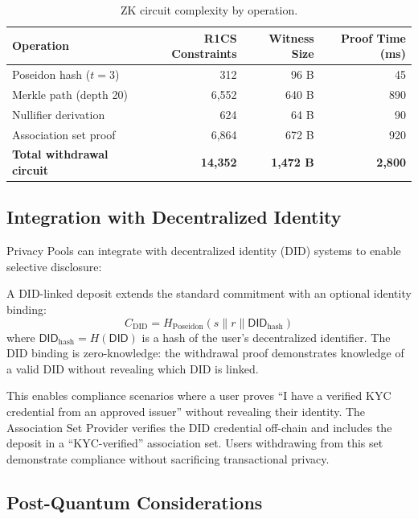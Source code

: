 \begin{table}[H]
\centering
\caption{ZK circuit complexity by operation.}
\label{tab:circuitcomplexity}
\begin{tabular}{lrrr}
\toprule
\textbf{Operation} & \textbf{R1CS Constraints} & \textbf{Witness Size} & \textbf{Proof Time (ms)} \\
\midrule
Poseidon hash ($t=3$) & 312 & 96 B & 45 \\
Merkle path (depth 20) & 6,552 & 640 B & 890 \\
Nullifier derivation & 624 & 64 B & 90 \\
Association set proof & 6,864 & 672 B & 920 \\
\midrule
\textbf{Total withdrawal circuit} & \textbf{14,352} & \textbf{1,472 B} & \textbf{2,800} \\
\bottomrule
\end{tabular}
\end{table}

\subsection{Integration with Decentralized Identity}

Privacy Pools can integrate with decentralized identity (DID) systems to enable selective disclosure:

\begin{definition}
A DID-linked deposit extends the standard commitment with an optional identity binding:
\begin{equation}
    C_{\text{DID}} = H_{\text{Poseidon}}(s \| r \| \mathsf{DID}_{\text{hash}})
\end{equation}
where $\mathsf{DID}_{\text{hash}} = H(\mathsf{DID})$ is a hash of the user's decentralized identifier. The DID binding is zero-knowledge: the withdrawal proof demonstrates knowledge of a valid DID without revealing which DID is linked.
\end{definition}

This enables compliance scenarios where a user proves ``I have a verified KYC credential from an approved issuer'' without revealing their identity. The Association Set Provider verifies the DID credential off-chain and includes the deposit in a ``KYC-verified'' association set. Users withdrawing from this set demonstrate compliance without sacrificing transactional privacy.

\subsection{Post-Quantum Considerations}

